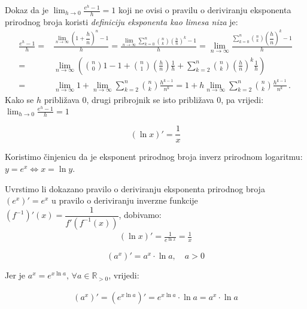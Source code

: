 Dokaz da je $\lim_{h\to 0} \frac{e^h - 1}{h} = 1$ koji ne ovisi o pravilu o
deriviranju eksponenta prirodnog broja koristi \textit{definiciju eksponenta kao
limesa niza} je:
\begin{align*}
    \frac{e^h - 1}{h} =& \frac{\displaystyle \lim_{n\to \infty} \left( 1 + \dfrac{h}{n} \right)^n - 1}{h}
    = \frac{\displaystyle \lim_{n \to \infty} \sum_{k=0}^{n} \binom{n}{k} \left(\frac{h}{n}\right)^k - 1}{h}
    = \lim_{n \to \infty} \frac{\displaystyle \sum_{k=0}^{n} \binom{n}{k} \left(\dfrac{h}{n}\right)^k - 1}{h}\\
    =& \lim_{n \to \infty} \left(\binom{n}{0} 1 - 1 + \binom{n}{1}\left(\frac{h}{n}\right)\frac{1}{h} + \sum_{k=2}^n \binom{n}{k}\left(\frac{h}{n}\right)^k\frac{1}{h} \right)\\
    =& \lim_{n \to \infty} 1 + \lim_{n \to \infty} \sum_{k=2}^n \binom{n}{k} \frac{h^{k-1}}{n^k} = 1 + h \lim_{n \to \infty} \sum_{k=2}^n \binom{n}{k} \frac{h^{k-1}}{n^k}\,.
\end{align*}
Kako se $h$ približava $0$, drugi pribrojnik se isto približava $0$, pa vrijedi:
$
\displaystyle \lim_{h\to 0} \frac{e^h - 1}{h} = 1
$

\begin{multicols}{2}

\begin{proposition}
    $$
        (\ln x)' = \frac{1}{x}
    $$
\end{proposition}

Koristimo činjenicu da je eksponent prirodnog broja inverz prirodnom logaritmu: $y = e^x \Longleftrightarrow x = \ln y$.

Uvrstimo li dokazano pravilo o deriviranju eksponenta prirodnog broja $(e^x)' = e^x$ u pravilo o deriviranju inverzne funkcije $(f^{-1})'(x) = \dfrac{1}{f'(f^{-1}(x))}$, dobivamo:
\begin{align*}
    (\ln x)' = \frac{1}{e^{\ln x}} = \frac{1}{x}
\end{align*}

\columnbreak

\begin{proposition}
    $$
        (a^x)' = a^x \cdot \ln a,\quad a > 0
    $$
\end{proposition}

Jer je $a^x = e^{x \ln a},\, \forall a \in \mathbb{R}_{>0}$, vrijedi:

\begin{align*}
    (a^x)' = (e^{x \ln a})' = e^{x \ln a} \cdot \ln a = a^x \cdot \ln a
\end{align*}

\end{multicols}

